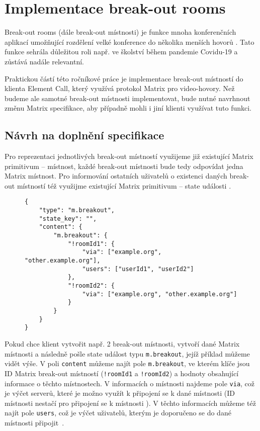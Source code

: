 \section{Implementace break-out rooms}\label{breakoutRooms}

Break-out rooms (dále break-out místnosti) je funkce mnoha konferenčních
aplikací umožňující rozdělení velké konference do několika menších hovorů
\cite{Zoom-EnablingMeetingBreakoutRooms,Microsoft-UseBreakoutRoomsInMSTeamsMeetings}.
Tato funkce sehrála důležitou roli např. ve školství během pandemie Covidu-19
\cite{AhmedKhalid-TheImpactOfUtilizingBreakoutRooms,Agustina-ZoomBreakoutRoomsForStudents}
a zůstává nadále relevantní.

Praktickou částí této ročníkové práce je implementace break-out místností do
klienta Element Call, který využívá protokol Matrix pro video-hovory. Než budeme
ale samotné break-out místnosti implementovat, bude nutné navrhnout změnu Matrix
specifikace, aby případně mohli i jiní klienti využívat tuto funkci.

\subsection{Návrh na doplnění specifikace}\label{breakoutRoomsMSC}

Pro reprezentaci jednotlivých break-out místností využijeme již existující
Matrix primitivum -- místnost, každé break-out místnosti bude tedy odpovídat
jedna Matrix místnost. Pro informování ostatních uživatelů o existenci daných
break-out místností též využijme existující Matrix primitivum -- state události
\cite{GitHub-MSC3985}.

\begin{figure}[H]
    \begin{verbatim}
{
	"type": "m.breakout",
	"state_key": "",
	"content": {
		"m.breakout": {
			"!roomId1": {
				"via": ["example.org", "other.example.org"],
				"users": ["userId1", "userId2"]
			},
			"!roomId2": {
				"via": ["example.org", "other.example.org"]
			}
		}
	}
}
	\end{verbatim}
\end{figure}

Pokud chce klient vytvořit např. 2 break-out místnosti, vytvoří dané Matrix
místnosti a následně pošle state událost typu \texttt{m.breakout},
jejíž příklad můžeme vidět výše. V poli \texttt{content} můžeme najít
pole \texttt{m.breakout}, ve kterém klíče jsou ID Matrix break-out
místností (\texttt{!roomId1} a \texttt{!roomId2}) a hodnoty
obsahující informace o těchto místnostech. V informacích o místnosti najdeme
pole \texttt{via}, což je výčet serverů, které je možno využít k
připojení se k dané místnosti (ID místnosti nestačí pro připojení se k místnosti
\cite{MatrixORG-Spec}). V těchto informacích můžeme též najít pole
\texttt{users}, což je výčet uživatelů, kterým je doporučeno se do
dané místnosti připojit~\cite{GitHub-MSC3985}.

